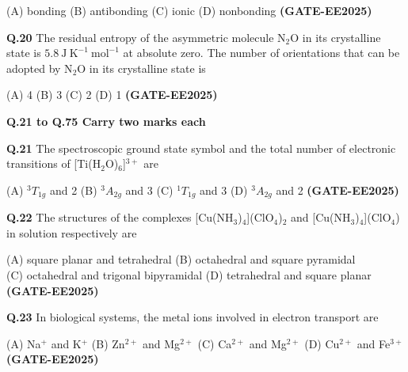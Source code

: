 \documentclass[12pt]{article}
\begin{document}
\begin{enumerate}
(A) bonding \hspace{1cm}
(B) antibonding \hspace{1cm}
(C) ionic \hspace{1cm}
(D) nonbonding   \textbf{(GATE-EE2025)}


\vspace{0.5cm}

\textbf{Q.20} The residual entropy of the asymmetric molecule N$_2$O in its crystalline state is $5.8\ \mathrm{J\ K^{-1}\ mol^{-1}}$ at absolute zero. The number of orientations that can be adopted by N$_2$O in its crystalline state is

(A) 4 \hspace{1cm}
(B) 3 \hspace{1cm}
(C) 2 \hspace{1cm}
(D) 1   \textbf{(GATE-EE2025)}


\vspace{0.5cm}

\textbf{Q.21 to Q.75 Carry two marks each}

\vspace{0.5cm}

\textbf{Q.21} The spectroscopic ground state symbol and the total number of electronic transitions of [Ti(H$_2$O)$_6$]$^{3+}$ are

(A) $^3T_{1g}$ and 2 \hspace{1cm}
(B) $^3A_{2g}$ and 3 \hspace{1cm}
(C) $^1T_{1g}$ and 3 \hspace{1cm}
(D) $^3A_{2g}$ and 2   \textbf{(GATE-EE2025)}


\vspace{0.5cm}

\textbf{Q.22} The structures of the complexes [Cu(NH$_3$)$_4$](ClO$_4$)$_2$ and [Cu(NH$_3$)$_4$](ClO$_4$) in solution respectively are

(A) square planar and tetrahedral \hspace{1cm}
(B) octahedral and square pyramidal\\
(C) octahedral and trigonal bipyramidal \hspace{1cm}
(D) tetrahedral and square planar   \textbf{(GATE-EE2025)}


\vspace{0.5cm}

\textbf{Q.23} In biological systems, the metal ions involved in electron transport are

(A) Na$^+$ and K$^+$ \hspace{1cm}
(B) Zn$^{2+}$ and Mg$^{2+}$ \hspace{1cm}
(C) Ca$^{2+}$ and Mg$^{2+}$ \hspace{1cm}
(D) Cu$^{2+}$ and Fe$^{3+}$   \textbf{(GATE-EE2025)}



\end{enumerate}
\end{document}
